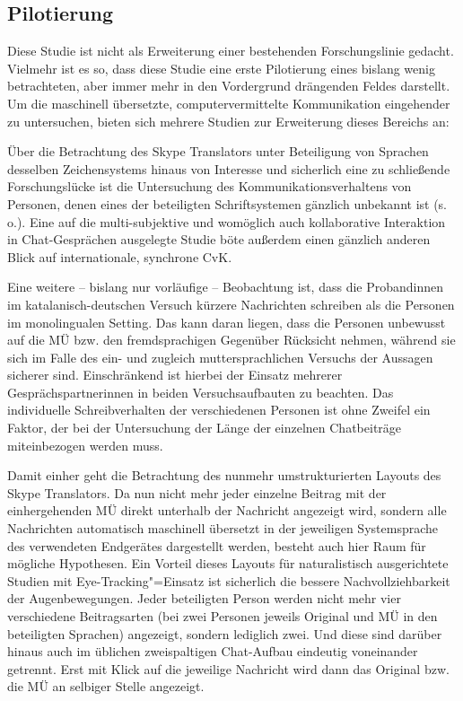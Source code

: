 \subsection{Pilotierung}\label{K7:para:pilotierung}
Diese Studie ist nicht als Erweiterung einer bestehenden Forschungslinie gedacht. Vielmehr ist es so, dass diese Studie eine erste Pilotierung eines bislang wenig betrachteten, aber immer mehr in den Vordergrund drängenden Feldes darstellt. Um die maschinell übersetzte, computervermittelte Kommunikation eingehender zu untersuchen, bieten sich mehrere Studien zur Erweiterung dieses Bereichs an: 

Über die Betrachtung des Skype Translators unter Beteiligung von Sprachen desselben Zeichensystems hinaus von Interesse und sicherlich eine zu schließende Forschungslücke ist die Untersuchung des Kommunikationsverhaltens von Personen, denen eines der beteiligten Schriftsystemen gänzlich unbekannt ist (s.\,o.). Eine auf die multi-subjektive und womöglich auch kollaborative Interaktion in Chat-Gesprächen ausgelegte Studie böte außerdem einen gänzlich anderen Blick auf internationale, synchrone CvK.

\begin{sloppypar}
Eine weitere -- bislang nur vorläufige -- Beobachtung ist, dass die Proband{\textperiodcentered}\linebreak[3] innen im katalanisch-deutschen Versuch kürzere Nachrichten schreiben als die Personen im monolingualen Setting. Das kann daran liegen, dass die Personen unbewusst auf die MÜ bzw. den fremdsprachigen Gegenüber Rücksicht nehmen, während sie sich im Falle des ein- und zugleich muttersprachlichen Versuchs der Aussagen sicherer sind. Einschränkend ist hierbei der Einsatz mehrerer Gesprächspartner{\textperiodcentered}innen in beiden Versuchsaufbauten zu beachten. Das individuelle Schreibverhalten der verschiedenen Personen ist ohne Zweifel ein Faktor, der bei der Untersuchung der Länge der einzelnen Chatbeiträge miteinbezogen werden muss.
\end{sloppypar}

Damit einher geht die Betrachtung des nunmehr umstrukturierten Layouts des Skype Translators. Da nun nicht mehr jeder einzelne Beitrag mit der einhergehenden MÜ direkt unterhalb der Nachricht angezeigt wird, sondern alle Nachrichten automatisch maschinell übersetzt in der jeweiligen Systemsprache des verwendeten Endgerätes dargestellt werden, besteht auch hier Raum für mögliche Hypothesen. Ein Vorteil dieses Layouts für naturalistisch ausgerichtete Studien mit Eye-Tracking"=Einsatz ist sicherlich die bessere Nachvollziehbarkeit der Augenbewegungen. Jeder beteiligten Person werden nicht mehr vier verschiedene Beitragsarten (bei zwei Personen jeweils Original und MÜ in den beteiligten Sprachen) angezeigt, sondern lediglich zwei. Und diese sind darüber hinaus auch im üblichen zweispaltigen Chat-Aufbau eindeutig voneinander getrennt. Erst mit Klick auf die jeweilige Nachricht wird dann das Original bzw. die MÜ an selbiger Stelle angezeigt.

